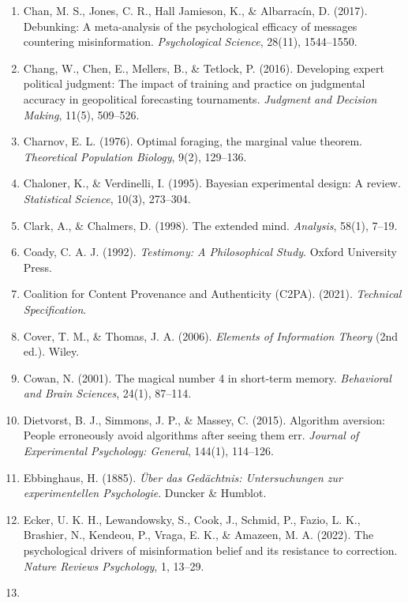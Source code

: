 \documentclass[
  11pt]{article}
\begin{document}
\begin{enumerate}
  Chan, M. S., \& Albarracín, D. (2023). A meta-analysis of correction
  effects in science-relevant misinformation. \emph{Nature Human
  Behaviour}, 7, 1164--1173.
\item
  Chan, M. S., Jones, C. R., Hall Jamieson, K., \& Albarracín, D.
  (2017). Debunking: A meta-analysis of the psychological efficacy of
  messages countering misinformation. \emph{Psychological Science},
  28(11), 1544--1550.
\item
  Chang, W., Chen, E., Mellers, B., \& Tetlock, P. (2016). Developing
  expert political judgment: The impact of training and practice on
  judgmental accuracy in geopolitical forecasting tournaments.
  \emph{Judgment and Decision Making}, 11(5), 509--526.
\item
  Charnov, E. L. (1976). Optimal foraging, the marginal value theorem.
  \emph{Theoretical Population Biology}, 9(2), 129--136.
\item
  Chaloner, K., \& Verdinelli, I. (1995). Bayesian experimental design:
  A review. \emph{Statistical Science}, 10(3), 273--304.
\item
  Clark, A., \& Chalmers, D. (1998). The extended mind. \emph{Analysis},
  58(1), 7--19.
\item
  Coady, C. A. J. (1992). \emph{Testimony: A Philosophical Study}.
  Oxford University Press.
\item
  Coalition for Content Provenance and Authenticity (C2PA). (2021).
  \emph{Technical Specification}.
\item
  Cover, T. M., \& Thomas, J. A. (2006). \emph{Elements of Information
  Theory} (2nd ed.). Wiley.
\item
  Cowan, N. (2001). The magical number 4 in short-term memory.
  \emph{Behavioral and Brain Sciences}, 24(1), 87--114.
\item
  Dietvorst, B. J., Simmons, J. P., \& Massey, C. (2015). Algorithm
  aversion: People erroneously avoid algorithms after seeing them err.
  \emph{Journal of Experimental Psychology: General}, 144(1), 114--126.
\item
  Ebbinghaus, H. (1885). \emph{Über das Gedächtnis: Untersuchungen zur
  experimentellen Psychologie}. Duncker \& Humblot.
\item
  Ecker, U. K. H., Lewandowsky, S., Cook, J., Schmid, P., Fazio, L. K.,
  Brashier, N., Kendeou, P., Vraga, E. K., \& Amazeen, M. A. (2022). The
  psychological drivers of misinformation belief and its resistance to
  correction. \emph{Nature Reviews Psychology}, 1, 13--29.
\item

\end{enumerate}
\end{document}
